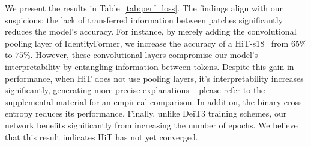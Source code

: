 We present the results in Table~\ref{tab:perf_loss}. The findings align with our suspicions: the lack of transferred information between patches significantly reduces the model's accuracy. For instance, by merely adding the convolutional pooling layer of IdentityFormer, we increase the accuracy of a HiT-s18~\cite{yu2024metaformer} from $65\%$ to $75\%$. However, these convolutional layers compromise our model's interpretability by entangling information between tokens. 
Despite this gain in performance, when HiT does not use pooling layers, it's interpretability increases significantly, generating more precise explanations -- please refer to the supplemental material for an empirical comparison. 
In addition, the binary cross entropy reduces its performance. 
Finally, unlike DeiT3 training schemes, our network benefits significantly from increasing the number of epochs. We believe that this result indicates HiT has not yet converged.
